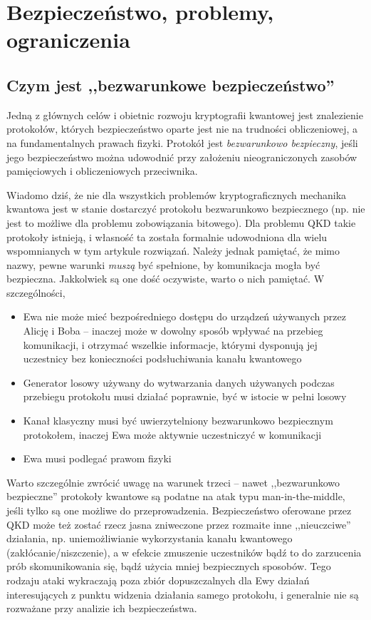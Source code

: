\documentclass[10pt]{article}
\begin{document}
\section{Bezpieczeństwo, problemy, ograniczenia}

\subsection{Czym jest ,,bezwarunkowe bezpieczeństwo''}

Jedną z głównych celów i obietnic rozwoju kryptografii kwantowej jest znalezienie protokołów, których
bezpieczeństwo oparte jest nie na trudności obliczeniowej, a na fundamentalnych prawach fizyki.
Protokół jest \emph{bezwarunkowo bezpieczny}, jeśli jego bezpieczeństwo można udowodnić przy założeniu
nieograniczonych zasobów pamięciowych i obliczeniowych przeciwnika\cite{Scarani09}. 

Wiadomo dziś, że nie dla wszystkich problemów kryptograficznych mechanika kwantowa jest w stanie 
dostarczyć protokołu bezwarunkowo bezpiecznego (np. nie jest to możliwe dla problemu zobowiązania 
bitowego\cite{Mayers97}). Dla problemu QKD takie protokoły istnieją, i własność ta została formalnie
udowodniona dla wielu wspomnianych w tym artykule rozwiązań. Należy jednak pamiętać, że mimo nazwy,
pewne warunki \emph{muszą} być spełnione, by komunikacja mogła być bezpieczna. Jakkolwiek są one
dość oczywiste, warto o nich pamiętać. W szczególności,

\begin{itemize}
  \item Ewa nie może mieć bezpośredniego dostępu do urządzeń używanych przez Alicję i Boba --
    inaczej może w dowolny sposób wpływać na przebieg komunikacji, i otrzymać wszelkie informacje,
    którymi dysponują jej uczestnicy bez konieczności podsłuchiwania kanału kwantowego
  \item Generator losowy używany do wytwarzania danych używanych podczas przebiegu protokołu musi
    działać poprawnie, być w istocie w pełni losowy
  \item Kanał klasyczny musi być uwierzytelniony bezwarunkowo bezpiecznym protokołem, inaczej
    Ewa może aktywnie uczestniczyć w komunikacji
  \item Ewa musi podlegać prawom fizyki
\end{itemize}

Warto szczególnie zwrócić uwagę na warunek trzeci -- nawet ,,bezwarunkowo bezpieczne'' protokoły
kwantowe są podatne na atak typu man-in-the-middle, jeśli tylko są one możliwe do przeprowadzenia.
Bezpieczeństwo oferowane przez QKD może też zostać rzecz jasna zniweczone przez rozmaite inne
,,nieuczciwe'' działania, np. uniemożliwianie wykorzystania kanału kwantowego (zakłócanie/niszczenie),
a w efekcie zmuszenie uczestników bądź to do zarzucenia prób skomunikowania się, bądź użycia mniej
bezpiecznych sposobów. Tego rodzaju ataki wykraczają poza zbiór dopuszczalnych dla Ewy działań
interesujących z punktu widzenia działania samego protokołu, i generalnie nie są rozważane przy
analizie ich bezpieczeństwa.
\end{document}

